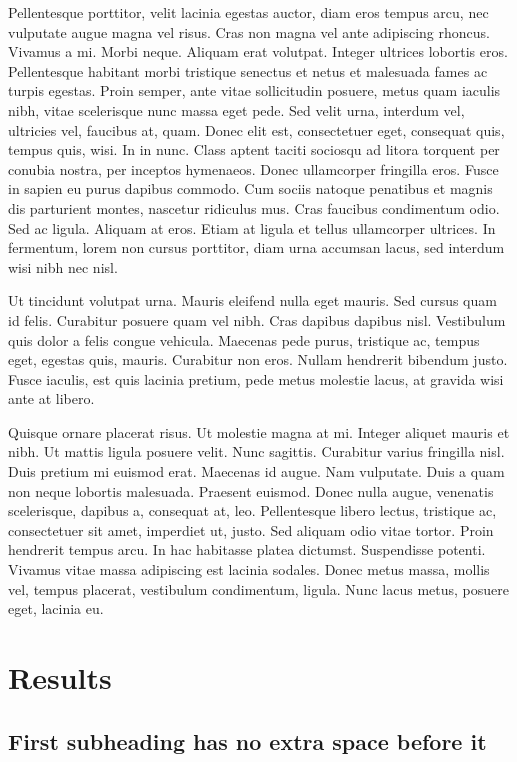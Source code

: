 \documentclass{biorxiv}
\begin{document}
Pellentesque porttitor, velit lacinia egestas auctor, diam eros tempus arcu,
nec vulputate augue magna vel risus. Cras non magna vel ante adipiscing
rhoncus. Vivamus a mi. Morbi neque. Aliquam erat volutpat. Integer ultrices
lobortis eros. Pellentesque habitant morbi tristique senectus et netus et
malesuada fames ac turpis egestas. Proin semper, ante vitae sollicitudin
posuere, metus quam iaculis nibh, vitae scelerisque nunc massa eget pede. Sed
velit urna, interdum vel, ultricies vel, faucibus at, quam. Donec elit est,
consectetuer eget, consequat quis, tempus quis, wisi. In in nunc. Class aptent
taciti sociosqu ad litora torquent per conubia nostra, per inceptos hymenaeos.
Donec ullamcorper fringilla eros. Fusce in sapien eu purus dapibus commodo.
Cum sociis natoque penatibus et magnis dis parturient montes, nascetur
ridiculus mus. Cras faucibus condimentum odio. Sed ac ligula. Aliquam at eros.
Etiam at ligula et tellus ullamcorper ultrices. In fermentum, lorem non cursus
porttitor, diam urna accumsan lacus, sed interdum wisi nibh nec nisl.

Ut tincidunt volutpat urna. Mauris eleifend nulla eget mauris. Sed cursus quam
id felis. Curabitur posuere quam vel nibh. Cras dapibus dapibus nisl.
Vestibulum quis dolor a felis congue vehicula. Maecenas pede purus, tristique
ac, tempus eget, egestas quis, mauris. Curabitur non eros. Nullam hendrerit
bibendum justo. Fusce iaculis, est quis lacinia pretium, pede metus molestie
lacus, at gravida wisi ante at libero.

Quisque ornare placerat risus. Ut molestie magna at mi. Integer aliquet mauris
et nibh. Ut mattis ligula posuere velit. Nunc sagittis. Curabitur varius
fringilla nisl. Duis pretium mi euismod erat. Maecenas id augue. Nam
vulputate. Duis a quam non neque lobortis malesuada. Praesent euismod. Donec
nulla augue, venenatis scelerisque, dapibus a, consequat at, leo. Pellentesque
libero lectus, tristique ac, consectetuer sit amet, imperdiet ut, justo. Sed
aliquam odio vitae tortor. Proin hendrerit tempus arcu. In hac habitasse
platea dictumst. Suspendisse potenti. Vivamus vitae massa adipiscing est
lacinia sodales. Donec metus massa, mollis vel, tempus placerat, vestibulum
condimentum, ligula. Nunc lacus metus, posuere eget, lacinia eu.

\section{Results}
\subsection{First subheading has no extra space before it}
\end{document}

